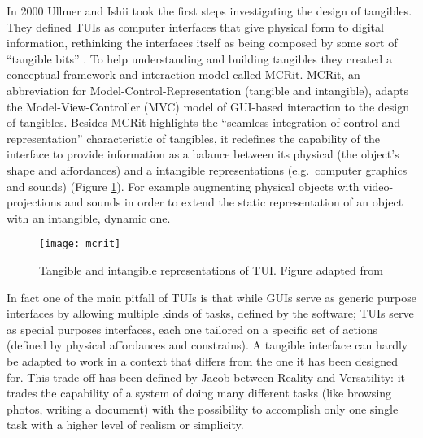 In 2000 Ullmer and Ishii \autocite*{Ullmer:2000vf} took the first steps investigating the design of tangibles. They defined TUIs as computer interfaces that give physical form to digital information, rethinking the interfaces itself as being composed by some sort of ``tangible bits'' \autocite{Ishii:2008fh}. To help understanding and building tangibles they created a conceptual framework and interaction model called MCRit. MCRit, an abbreviation for Model-Control-Representation (tangible and intangible), adapts the Model-View-Controller (MVC) model of GUI-based interaction to the design of tangibles. Besides MCRit highlights the ``seamless integration of control and representation'' characteristic of tangibles, it redefines the capability of the interface to provide information as a balance between its physical (the object's shape and affordances) and a intangible representations (e.g.~computer graphics and sounds) (Figure \ref{fig:mcrit-model}). For example augmenting physical objects with video-projections and sounds in order to extend the static representation of an object with an intangible, dynamic one.
\begin{figure}
	[tbh] \centering 
	\texttt{[image: mcrit]} \caption{Tangible and intangible representations of TUI. Figure adapted from \protect\autocite{Ishii:2008fh}} \label{fig:mcrit-model} 
\end{figure}

In fact one of the main pitfall of TUIs is that while GUIs serve as generic purpose interfaces by allowing multiple kinds of tasks, defined by the software; TUIs serve as special purposes interfaces, each one tailored on a specific set of actions (defined by physical affordances and constrains). A tangible interface can hardly be adapted to work in a context that differs from the one it has been designed for. This trade-off has been defined by Jacob \autocite*{Jacob:2008vm} between Reality and Versatility: it trades the capability of a system of doing many different tasks (like browsing photos, writing a document) with the possibility to accomplish only one single task with a higher level of realism or simplicity.

